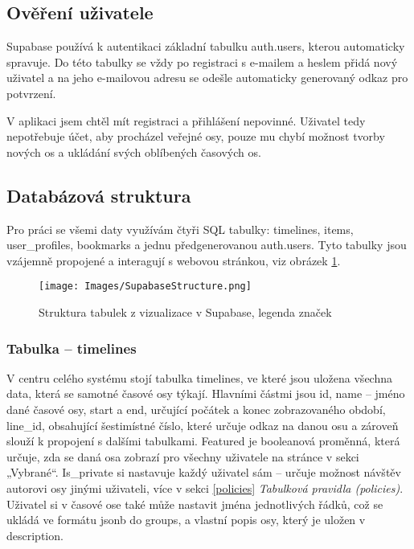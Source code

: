 \subsection{Ověření uživatele}
Supabase používá k autentikaci základní tabulku auth.users, kterou automaticky spravuje. Do této tabulky se vždy po registraci s e-mailem a heslem přidá nový uživatel a na jeho e-mailovou adresu se odešle automaticky generovaný odkaz pro potvrzení. 

V aplikaci jsem chtěl mít registraci a přihlášení nepovinné. Uživatel tedy nepotřebuje účet, aby procházel veřejné osy, pouze mu chybí možnost tvorby nových os a ukládání svých oblíbených časových os. 
\cite{Nuxt-Auth, Supabase-Middleware-fix, guest-logged-in-access-Chat}  

\subsection{Databázová struktura}
Pro práci se všemi daty využívám čtyři SQL tabulky: timelines, items, user\_profiles, bookmarks a jednu předgenerovanou auth.users. Tyto tabulky jsou vzájemně propojené a interagují s webovou stránkou, viz obrázek \ref{fig:Struktura tabulek}.

\begin{figure}[h]
    \centering
    \texttt{[image: Images/SupabaseStructure.png]}
    \caption{Struktura tabulek z vizualizace v Supabase, legenda značek}
    \label{fig:Struktura tabulek}
\end{figure}

\subsubsection{Tabulka – timelines}
V centru celého systému stojí tabulka timelines, ve které jsou uložena všechna data, která se samotné časové osy týkají. Hlavními částmi jsou id, name – jméno dané časové osy, start a end, určující počátek a konec zobrazovaného období, line\_id, obsahující šestimístné číslo, které určuje odkaz na danou osu a zároveň slouží k propojení s dalšími tabulkami. \newpage
Featured je booleanová proměnná, která určuje, zda se daná osa zobrazí pro všechny uživatele na stránce v sekci „Vybrané“. Is\_private si nastavuje každý uživatel sám – určuje možnost návštěv autorovi osy jinými uživateli, více v sekci \ref{policies} \textit{Tabulková pravidla (policies)}. Uživatel si v časové ose také může nastavit jména jednotlivých řádků, což se ukládá ve formátu jsonb \cite{jsonb} do groups, a vlastní popis osy, který je uložen v description. 

